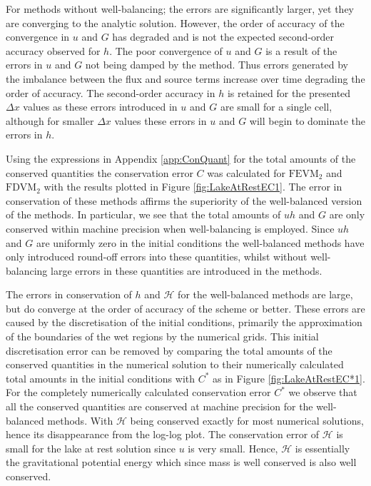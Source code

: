 For methods without well-balancing; the errors are significantly larger, yet they are converging to the analytic solution. However, the order of accuracy of the convergence in $u$ and $G$ has degraded and is not the expected second-order accuracy observed for $h$. The poor convergence of $u$ and $G$ is a result of the errors in $u$ and $G$ not being damped by the method. Thus errors generated by the imbalance between the flux and source terms increase over time degrading the order of accuracy. The second-order accuracy in $h$ is retained for the presented $\Delta x$ values as these errors introduced in $u$ and $G$ are small for a single cell, although for smaller $\Delta x$ values these errors in $u$ and $G$ will begin to dominate the errors in $h$. 


Using the expressions in Appendix \ref{app:ConQuant} for the total amounts of the conserved quantities the conservation error $C$ was calculated for $\text{FEVM}_2$ and $\text{FDVM}_2$ with the results plotted in Figure \ref{fig:LakeAtRestEC1}. The error in conservation of these methods affirms the superiority of the well-balanced version of the methods. In particular, we see that the total amounts of $uh$ and $G$ are only conserved within machine precision when well-balancing is employed. Since $uh$ and $G$ are uniformly zero in the initial conditions the well-balanced methods have only introduced round-off errors into these quantities, whilst without well-balancing large errors in these quantities are introduced in the methods. 

The errors in conservation of $h$ and $\mathcal{H}$ for the well-balanced methods are large, but do converge at the order of accuracy of the scheme or better. These errors are caused by the discretisation of the initial conditions, primarily the approximation of the boundaries of the wet regions by the numerical grids. This initial discretisation error can be removed by comparing the total amounts of the conserved quantities in the numerical solution to their numerically calculated total amounts in the initial conditions with $C^*$ as in Figure \ref{fig:LakeAtRestEC*1}. For the completely numerically calculated conservation error $C^*$ we observe that all the conserved quantities are conserved at machine precision for the well-balanced methods. With $\mathcal{H}$ being conserved exactly for most numerical solutions, hence its disappearance from the log-log plot. The conservation error of $\mathcal{H}$ is small for the lake at rest solution since $u$ is very small. Hence, $\mathcal{H}$ is essentially the gravitational potential energy which since mass is well conserved is also well conserved.

